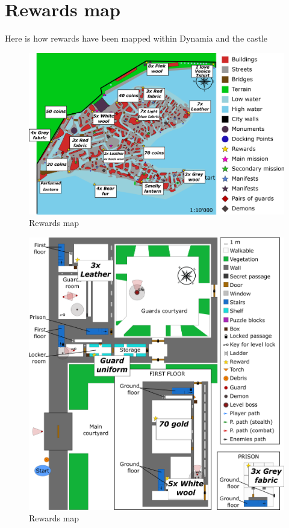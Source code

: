 \section{Rewards map}
Here is how rewards have been mapped within Dynamia and the castle
\begin{figure}[H]
  \centering
  \includegraphics[width=\textwidth]{Images/Maps/dynamiaRewardsMapping}
  \caption{Rewards map}
\end{figure}

\begin{figure}[H]
  \centering
  \includegraphics[width=\textwidth]{Images/Maps/castleOfDynamiaRewardsMapping}
  \caption{Rewards map}
\end{figure}

\hspace{0pt} \\ %
